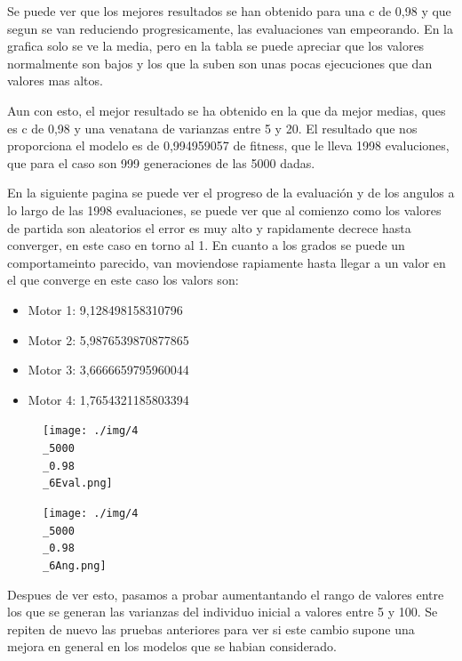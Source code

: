 \documentclass[12pt, spanish, pdftex]{UC3M_document}
\begin{document}
Se puede ver que los mejores resultados se han obtenido para una c de 0,98 y que segun se van reduciendo progresicamente, las evaluaciones van empeorando. En la grafica solo se ve la media, pero en la tabla se puede apreciar que los valores normalmente son bajos y los que la suben son unas pocas ejecuciones que dan valores mas altos. 

Aun con esto, el mejor resultado se ha obtenido en la que da mejor medias, ques es c de 0,98 y una venatana de varianzas entre 5 y 20. El resultado que nos proporciona el modelo es de 0,994959057 de fitness, que le lleva 1998 evaluciones, que para el caso son 999 generaciones de las 5000 dadas.

En la siguiente pagina se puede ver el progreso de la evaluación y de los angulos a lo largo de las 1998 evaluaciones, se puede ver que al comienzo como los valores de partida son aleatorios el error es muy alto y rapidamente decrece hasta converger, en este caso en torno al 1. En cuanto a los grados se puede un comportameinto parecido, van moviendose rapiamente hasta llegar a un  valor en el que converge en este caso los valors son:
\begin{itemize}
	\item Motor 1: 9,128498158310796
	\item Motor 2: 5,9876539870877865 
	\item Motor 3: 3,6666659795960044 
	\item Motor 4: 1,7654321185803394
\end{itemize}
\begin{figure}[H]
	{\texttt{[image: ./img/4\\\_5000\\\_0.98\\\_6Eval.png]}}
\end{figure}
\begin{figure}[H]
	{\texttt{[image: ./img/4\\\_5000\\\_0.98\\\_6Ang.png]}}
\end{figure}

Despues de ver esto, pasamos a probar aumentantando el rango de valores entre los que se generan las varianzas del individuo inicial a valores entre 5 y 100. Se repiten de nuevo las pruebas anteriores para ver si este cambio supone una mejora en  general en los modelos que se habian considerado.
\end{document}
